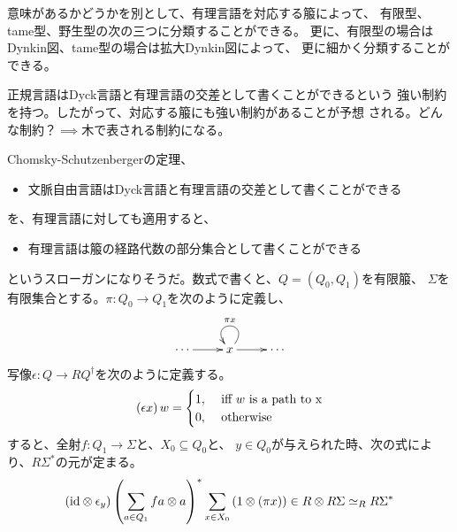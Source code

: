 {	\begin{note}[箙の分類と有理言語の分類]
	\label{note:箙の分類と有理言語の分類} %
		意味があるかどうかを別として、有理言語を対応する箙によって、
		有限型、tame型、野生型の次の三つに分類することができる。
		更に、有限型の場合はDynkin図、tame型の場合は拡大Dynkin図によって、
		更に細かく分類することができる。
	\end{note} %

	\begin{todo}[箙と正規言語]\label{todo:箙と正規言語} %
		正規言語はDyck言語と有理言語の交差として書くことができるという
		強い制約を持つ。したがって、対応する箙にも強い制約があることが予想
		される。どんな制約？$\implies$木で表される制約になる。
	\end{todo} %

	\begin{todo}[有理言語の性質]\label{todo:有理言語の性質} %
		Chomsky-Schutzenbergerの定理、
		\begin{itemize}\setlength{\itemsep}{-1mm} %
			\item 文脈自由言語はDyck言語と有理言語の交差として書くことができる
		\end{itemize} %
		を、有理言語に対しても適用すると、
		\begin{itemize}\setlength{\itemsep}{-1mm} %
			\item 有理言語は箙の経路代数の部分集合として書くことができる
		\end{itemize} %
		というスローガンになりそうだ。数式で書くと、$Q=(Q_0,Q_1)$を有限箙、
		$\Sigma$を有限集合とする。$\pi:Q_0\to Q_1$を次のように定義し、
		\begin{equation*}\begin{split}
			\xymatrix{
				\cdots \ar[r] & x \ar[r] \ar@(ur,ul)_{\pi x} & \cdots
			}
		\end{split}\end{equation*}
		写像$\epsilon:Q\to RQ^\dag$を次のように定義する。
		\begin{equation*}\begin{split}
			\left({\epsilon x}\right)w = \begin{cases}
				1, &\text{ iff } w \text{ is a path to x} \\
				0, &\text{ otherwise } \\
			\end{cases}
		\end{split}\end{equation*}
		すると、全射$f:Q_1\to\Sigma$と、$X_0\subseteq Q_0$と、
		$y\in Q_0$が与えられた時、次の式により、$R\Sigma^*$の元が定まる。
		\begin{equation*}\begin{split}
			\left({{\operatorname{id}}\otimes\epsilon_y}\right)\left({\sum_{a\in Q_1}fa\otimes a}\right)^*
			\sum_{x\in X_0}\left({1\otimes\left({\pi x}\right)}\right)\in R\otimes R\Sigma
			\simeq_RR\Sigma^*
		\end{split}\end{equation*}
	\end{todo} %

}
